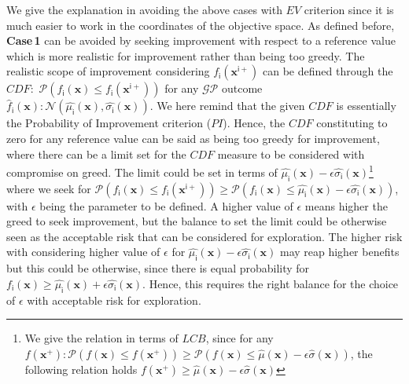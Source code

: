 We give the explanation in avoiding the above cases with $EV$ criterion since it is much easier to work in the coordinates of the objective space. As defined before, \textbf{Case\,1} can be avoided by seeking improvement with respect to a reference value which is more realistic for improvement rather than being too greedy. 
 The realistic scope of improvement considering $f_{\mathsf{i}}(\bm x^{\mathsf{i}+})$ can be defined through the $CDF:$ $\mathcal{P}({f}_{\mathsf{i}}(\bm{x})\leq f_{\mathsf{i}}(\bm x^{\mathsf{i}+}))$ for any $\mathcal{GP}$ outcome $\hat{f}_{\mathsf{i}}(\bm{x}):\mathcal{N}(\hat{\mu_{\mathsf{i}}}(\bm{x}),\hat{\sigma_{\mathsf{i}}}(\bm{x}))$. 
 We here remind that the given $CDF$ is essentially the Probability of Improvement criterion ($PI$). 
 Hence, the $CDF$ constituting to zero for any reference value can be said as being too greedy for improvement, where there can be a limit set for the $CDF$ measure to be considered with compromise on greed. 
 The limit could be set in terms of $\hat{\mu_{\mathsf{i}}}(\bm{x})-\epsilon\hat{\sigma_{\mathsf{i}}}(\bm{x})$\footnote{We give the relation in terms of $LCB$, since for any $f(\bm x^{+}):\mathcal{P}({f}(\bm{x})\leq f(\bm x^{+}))\geq\mathcal{P}({f}(\bm{x})\leq \hat{\mu}(\bm{x})-\epsilon\hat{\sigma}(\bm{x}))$, the following relation holds $f(\bm x^{+}) \geq \hat{\mu}(\bm{x})-\epsilon\hat{\sigma}(\bm{x})$ } where we seek for $\mathcal{P}({f}_{\mathsf{i}}(\bm{x})\leq f_{\mathsf{i}}(\bm x^{\mathsf{i}+}))\geq\mathcal{P}({f}_{\mathsf{i}}(\bm{x})\leq \hat{\mu_{\mathsf{i}}}(\bm{x})-\epsilon\hat{\sigma_{\mathsf{i}}}(\bm{x}))$, with $\epsilon$ being the parameter to be defined. 
 A higher value of $\epsilon$ means higher the greed to seek improvement, but the balance to set the limit could be otherwise seen as the acceptable risk that can be considered for exploration. The higher risk with considering higher value of $\epsilon$ for $\hat{\mu_{\mathsf{i}}}(\bm{x})-\epsilon\hat{\sigma_{\mathsf{i}}}(\bm{x})$ may reap higher benefits but this could be otherwise, since there is equal probability for ${f}_{\mathsf{i}}(\bm{x})\geq\hat{\mu_{\mathsf{i}}}(\bm{x})+\epsilon\hat{\sigma_{\mathsf{i}}}(\bm{x})$. Hence, this requires the right balance for the choice of $\epsilon$ with acceptable risk for exploration.\\

